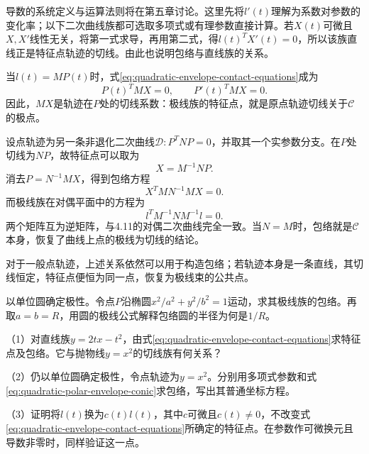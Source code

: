 导数的系统定义与运算法则将在第五章讨论。这里先将\(l'(t)\)理解为系数对参数的变化率；以下二次曲线族都可选取多项式或有理参数直接计算。若\(X(t)\)可微且\(X,X'\)线性无关，将第一式求导，再用第二式，得\(l(t)^TX'(t)=0\)，所以该族直线正是特征点轨迹的切线。由此也说明包络与直线族的关系。

当\(l(t)=MP(t)\)时，式\eqref{eq:quadratic-envelope-contact-equations}成为
\begin{equation*}
 P(t)^TMX=0,\qquad P'(t)^TMX=0.
\end{equation*}
因此，\(MX\)是轨迹在\(P\)处的切线系数：{\heiti{}极线族的特征点，就是原点轨迹切线关于\(\mathcal C\)的极点}。

设点轨迹为另一条非退化二次曲线\(\mathcal D:P^TNP=0\)，并取其一个实参数分支。在\(P\)处切线为\(NP\)，故特征点可以取为
\begin{equation*}
 X=M^{-1}NP.
\end{equation*}
消去\(P=N^{-1}MX\)，得到包络方程
\begin{equation}\label{eq:quadratic-polar-envelope-conic}
 X^TMN^{-1}MX=0.
\end{equation}
而极线族在对偶平面中的方程为
\begin{equation*}
 l^TM^{-1}NM^{-1}l=0.
\end{equation*}
两个矩阵互为逆矩阵，与4.11的对偶二次曲线完全一致。当\(N=M\)时，包络就是\(\mathcal C\)本身，恢复了曲线上点的极线为切线的结论。

对于一般点轨迹，上述关系依然可以用于构造包络；若轨迹本身是一条直线，其切线恒定，特征点便恒为同一点，恢复为极线束的公共点。

\begin{example}
以单位圆确定极性。令点\(P\)沿椭圆\(x^2/a^2+y^2/b^2=1\)运动，求其极线族的包络。再取\(a=b=R\)，用圆的极线公式解释包络圆的半径为何是\(1/R\)。
\end{example}

\begin{exercise}
\mbox{}\par\nobreak

（1）对直线族\(y=2tx-t^2\)，由式\eqref{eq:quadratic-envelope-contact-equations}求特征点及包络。它与抛物线\(y=x^2\)的切线族有何关系？

（2）仍以单位圆确定极性，令点轨迹为\(y=x^2\)。分别用多项式参数和式\eqref{eq:quadratic-polar-envelope-conic}求包络，写出其普通坐标方程。

（3）证明将\(l(t)\)换为\(c(t)l(t)\)，其中\(c\)可微且\(c(t)\ne0\)，不改变式\eqref{eq:quadratic-envelope-contact-equations}所确定的特征点。在参数作可微换元且导数非零时，同样验证这一点。
\end{exercise}

